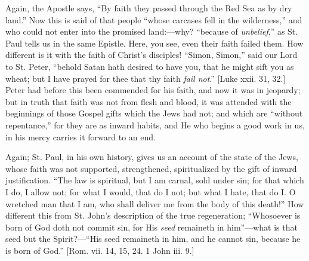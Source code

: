 Again, the Apostle says, ``By faith they passed through the Red
Sea as by dry land.'' Now this is said of that people ``whose
carcases fell in the wilderness,'' and who could not enter into
the promised land:—why? ``because of \emph{unbelief},'' as
St. Paul tells us in the same Epistle. Here, you see, even their faith
failed them. How different is it with the faith of Christ's disciples!
``Simon, Simon,'' said our Lord to St. Peter, ``behold
Satan hath desired to have you, that he might sift you as wheat; but I
have prayed for thee that thy faith \emph{fail not}.'' [Luke xxii.
31, 32.] Peter had before this been commended for his faith, and now
it was in jeopardy; but in truth that faith was not from flesh and
blood, it was attended with the beginnings of those Gospel gifts which
the Jews had not; and which are ``without repentance,'' for
they are as inward habits, and He who begins a good work in us, in his
mercy carries it forward to an end.

Again; St. Paul, in his own history, gives us an account of the
state of the Jews, whose faith was not supported, strengthened,
spiritualized by the gift of inward justification. ``The law is
spiritual, but I am carnal, sold under sin; for that which I do, I
allow not; for what I would, that do I not; but what I hate, that do
I.
O wretched man that I am, who shall deliver me from the body of this
death!'' How different this from St. John's description of the
true regeneration; ``Whosoever is born of God doth not commit sin,
for His \emph{seed} remaineth in him''—what is that seed but the
Spirit?—``His seed remaineth in him, and he cannot sin, because
he is born of God.'' [Rom. vii. 14, 15, 24. 1 John iii. 9.]


